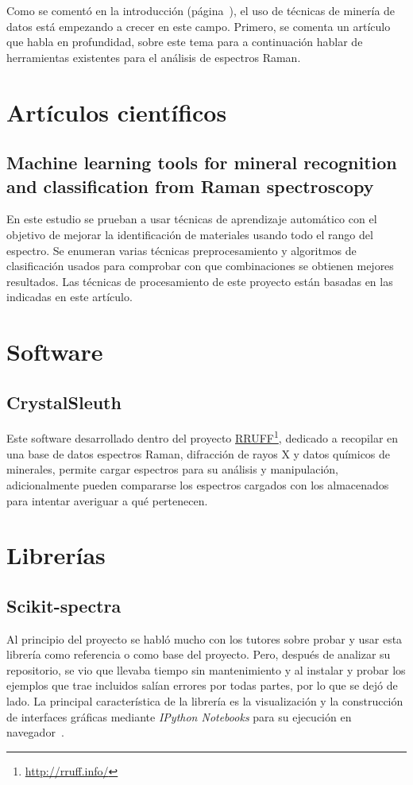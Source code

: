 
Como se comentó en la introducción (página~\pageref{ch:introduccion}), el uso de
técnicas de minería de datos está empezando a crecer en este campo. Primero, se
comenta un artículo que habla en profundidad, sobre este tema para a
continuación hablar de herramientas existentes para el análisis de espectros
Raman.

\section{Artículos científicos}

\subsection{Machine learning tools for mineral recognition	and classification
	from Raman spectroscopy~\cite{art:raman-carey}}\label{sec:carey}
En este estudio se prueban a usar técnicas de aprendizaje automático con el
objetivo de mejorar la identificación de materiales usando todo el rango del
espectro. Se enumeran varias técnicas preprocesamiento y algoritmos de
clasificación usados para comprobar con que combinaciones se obtienen mejores
resultados. Las técnicas de procesamiento de este proyecto están basadas en las
indicadas en este artículo.

\section{Software}

\subsection{CrystalSleuth}
Este software desarrollado dentro del proyecto 
\href{http://rruff.info/}{RRUFF}\footnote{\url{http://rruff.info/}}, dedicado a
recopilar en una base de datos espectros Raman, difracción de rayos X y datos
químicos de minerales, permite cargar espectros para su análisis y manipulación,
adicionalmente pueden compararse los espectros cargados con los almacenados para
intentar averiguar a qué pertenecen.

\section{Librerías}

\subsection{Scikit-spectra}
Al principio del proyecto se habló mucho con los tutores sobre probar y usar
esta librería como referencia o como base del proyecto. Pero, después de
analizar su repositorio, se vio que llevaba tiempo sin mantenimiento y al
instalar y probar los ejemplos que trae incluidos salían errores por todas
partes, por lo que se dejó de lado. La principal característica de la librería
es la visualización y la construcción de interfaces gráficas mediante
\textit{IPython Notebooks} para su ejecución en navegador~\cite{art:skspec}.


